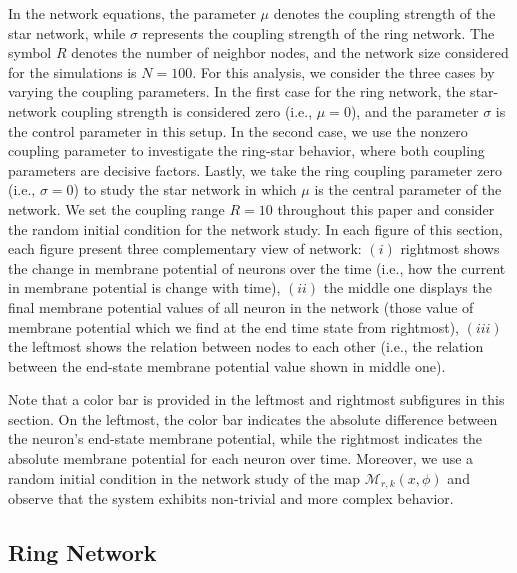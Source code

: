 \documentclass{article}
\begin{document}
\noindent In the network equations, the parameter $\mu$ denotes the coupling strength of the star network, while $\sigma$ represents the coupling strength of the ring network. The symbol $R$ denotes the number of neighbor nodes, and the network size considered for the simulations is $ N = 100$. For this analysis, we consider the three cases by varying the coupling parameters. In the first case for the ring network, the star-network coupling strength is considered zero (i.e., $\mu=0$), and the parameter $\sigma$ is the control parameter in this setup. In the second case, we use the nonzero coupling parameter to investigate the ring-star behavior, where both coupling parameters are decisive factors. Lastly, we take the ring coupling parameter zero (i.e., $\sigma=0$) to study the star network in which $\mu$ is the central parameter of the network. We set the coupling range $R=10$ throughout this paper and consider the random initial condition for the network study. In each figure of this section, each figure present three complementary view of network: $(i)$ rightmost shows the change in membrane potential of neurons over the time (i.e., how the current in membrane potential is change with time), $(ii)$ the middle one displays the final membrane potential values of all neuron in the network (those value of membrane potential which we find at the end time state from rightmost), $(iii)$ the leftmost shows the relation between nodes to each other (i.e., the relation between the end-state membrane potential value shown in middle one).

Note that a color bar is provided in the leftmost and rightmost subfigures in this section. On the leftmost, the color bar indicates the absolute difference between the neuron's end-state membrane potential, while the rightmost indicates the absolute membrane potential for each neuron over time. Moreover, we use a random initial condition in the network study of the map $\mathcal{M}_{r,k}(x,\phi)$ and observe that the system exhibits non-trivial and more complex behavior.


\subsection{Ring Network} 
\end{document}

